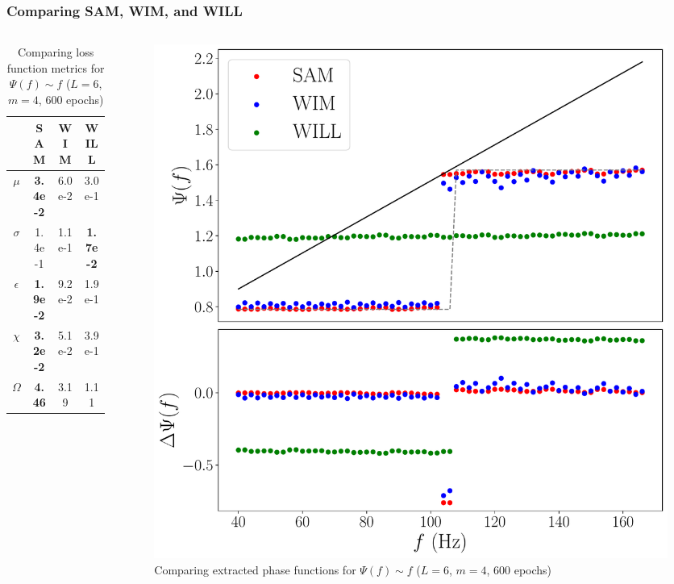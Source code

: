 \documentclass{beamer}
\begin{document}
\begin{frame}
\frametitle{Comparing SAM, WIM, and WILL}
\begin{columns}
\begin{column}{0.5\textwidth}
\begin{table}
\begin{tabular}{c || c| c| c }
& SAM & WIM & WILL \\ \hline \hline 
$\mu$ &  \textbf{3.4e-2} & 6.0e-2 & 3.0e-1 \\
$\sigma$ &  1.4e-1 &1.1e-1 & \textbf{ 1.7e-2}\\
$\epsilon$  &  \textbf{1.9e-2} & 9.2e-2 & 1.9e-1\\
$\chi$ & \textbf{ 3.2e-2} & 5.1e-2  & 3.9e-1  \\ \hline 
$\Omega$ &  \textbf{4.46} & 3.19 & 1.11
\end{tabular}
\caption{Comparing loss function metrics for $\Psi(f) \sim f$ ($L=6$, $m=4$, 600 epochs)}
\end{table}
\end{column}
\begin{column}{0.5\textwidth}
\begin{figure}
\centering 
\includegraphics[width=\textwidth]{im/SAM_WIM_WILL_F}
\caption{Comparing extracted phase functions for $\Psi(f) \sim f$ ($L=6$, $m=4$, 600 epochs)}
\end{figure}
\end{column}
\end{columns}
\end{frame}
\end{document}
